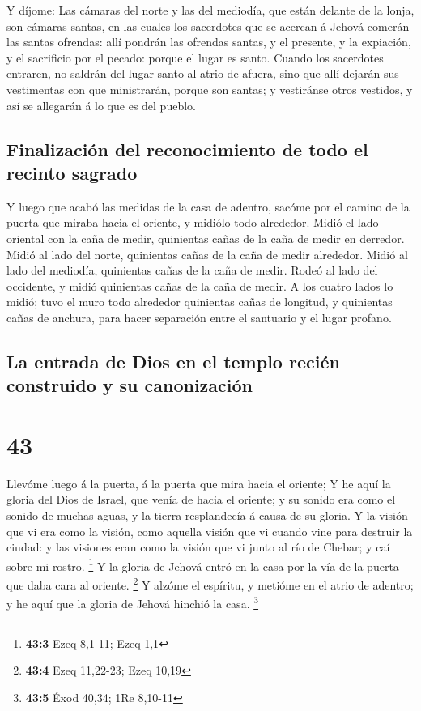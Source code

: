  Y díjome: Las cámaras del norte y las del mediodía, que
están delante de la lonja, son cámaras santas, en las cuales los
sacerdotes que se acercan á Jehová comerán las santas ofrendas: allí
pondrán las ofrendas santas, y el presente, y la expiación, y el
sacrificio por el pecado: porque el lugar es santo.  Cuando
los sacerdotes entraren, no saldrán del lugar santo al atrio de afuera,
sino que allí dejarán sus vestimentas con que ministrarán, porque son
santas; y vestiránse otros vestidos, y así se allegarán á lo que es del
pueblo.

\hypertarget{finalizaciuxf3n-del-reconocimiento-de-todo-el-recinto-sagrado}{%
\subsection{Finalización del reconocimiento de todo el recinto
sagrado}\label{finalizaciuxf3n-del-reconocimiento-de-todo-el-recinto-sagrado}}

 Y luego que acabó las medidas de la casa de adentro,
sacóme por el camino de la puerta que miraba hacia el oriente, y midiólo
todo alrededor.  Midió el lado oriental con la caña de
medir, quinientas cañas de la caña de medir en derredor. 
Midió al lado del norte, quinientas cañas de la caña de medir alrededor.
 Midió al lado del mediodía, quinientas cañas de la caña de
medir.  Rodeó al lado del occidente, y midió quinientas
cañas de la caña de medir.  A los cuatro lados lo midió;
tuvo el muro todo alrededor quinientas cañas de longitud, y quinientas
cañas de anchura, para hacer separación entre el santuario y el lugar
profano.

\hypertarget{la-entrada-de-dios-en-el-templo-reciuxe9n-construido-y-su-canonizaciuxf3n}{%
\subsection{La entrada de Dios en el templo recién construido y su
canonización}\label{la-entrada-de-dios-en-el-templo-reciuxe9n-construido-y-su-canonizaciuxf3n}}

\hypertarget{section-42}{%
\section{43}\label{section-42}}

 Llevóme luego á la puerta, á la puerta que mira hacia el
oriente;  Y he aquí la gloria del Dios de Israel, que venía
de hacia el oriente; y su sonido era como el sonido de muchas aguas, y
la tierra resplandecía á causa de su gloria.  Y la visión
que vi era como la visión, como aquella visión que vi cuando vine para
destruir la ciudad: y las visiones eran como la visión que vi junto al
río de Chebar; y caí sobre mi rostro. \footnote{\textbf{43:3} Ezeq
  8,1-11; Ezeq 1,1}  Y la gloria de Jehová entró en la casa
por la vía de la puerta que daba cara al oriente. \footnote{\textbf{43:4}
  Ezeq 11,22-23; Ezeq 10,19}  Y alzóme el espíritu, y
metióme en el atrio de adentro; y he aquí que la gloria de Jehová
hinchió la casa. \footnote{\textbf{43:5} Éxod 40,34; 1Re 8,10-11}

